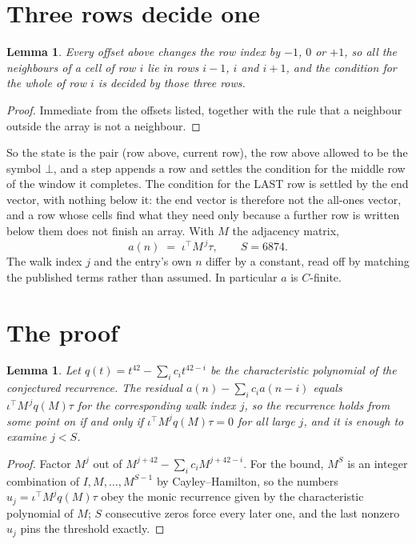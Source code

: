 \documentclass[11pt,a4paper]{article}
\theoremstyle{plain}
\newtheorem{lemma}[theorem]{Lemma}
\theoremstyle{definition}
\begin{document}
\section{Three rows decide one}

\begin{lemma}\label{lem:win}
Every offset above changes the row index by $-1$, $0$ or $+1$, so all the neighbours of a cell
of row $i$ lie in rows $i-1$, $i$ and $i+1$, and the condition for the whole of row $i$ is
decided by those three rows.
\end{lemma}

\begin{proof}
Immediate from the offsets listed, together with the rule that a neighbour outside the array is
not a neighbour.
\end{proof}

So the state is the pair (row above, current row), the row above allowed to be the symbol
$\bot$, and a step appends a row and settles the condition for the middle row of the window it
completes. The condition for the LAST row is settled by the end vector, with nothing below it:
the end vector is therefore not the all-ones vector, and a row whose cells find what they need
only because a further row is written below them does not finish an array. With $M$ the
adjacency matrix,
\[
a(n)\;=\;\iota^{\!\top}M^{\,j}\tau ,\qquad S=6874.
\]
The walk index $j$ and the entry's own $n$ differ by a constant, read off by matching the
published terms rather than assumed. In particular $a$ is $C$-finite.

\section{The proof}

\begin{lemma}\label{lem:crit}
Let $q(t)=t^{42}-\sum_i c_it^{42-i}$ be the characteristic polynomial of the
conjectured recurrence. The residual $a(n)-\sum_ic_ia(n-i)$ equals
$\iota^{\!\top}M^{\,j}q(M)\tau$ for the corresponding walk index $j$, so the recurrence
holds from some point on if and only if $\iota^{\!\top}M^{j}q(M)\tau=0$ for all large $j$,
and it is enough to examine $j<S$.
\end{lemma}

\begin{proof}
Factor $M^{j}$ out of $M^{j+42}-\sum_ic_iM^{j+42-i}$. For the bound, $M^{S}$
is an integer combination of $I,M,\dots,M^{S-1}$ by Cayley--Hamilton, so the numbers
$u_j=\iota^{\!\top}M^{j}q(M)\tau$ obey the monic recurrence given by the characteristic
polynomial of $M$; $S$ consecutive zeros force every later one, and the last nonzero $u_j$
pins the threshold exactly.
\end{proof}
\end{document}
